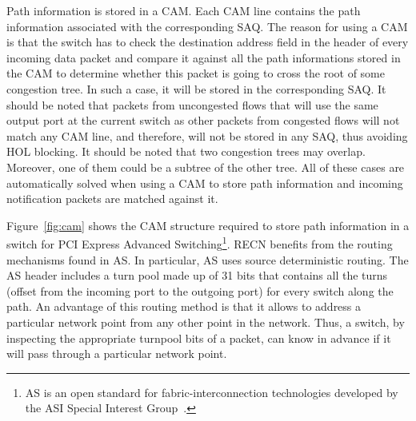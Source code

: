 \documentclass[12pt]{article}
\begin{document}
Path information is stored in a CAM. Each CAM line contains the path information associated with the corresponding SAQ. The reason for using a CAM is that the switch has to check the destination address field in the header of every incoming data packet and compare it against all the path informations stored in the CAM to determine whether this packet is going to cross the root of some congestion tree. In such a case, it will be stored in the corresponding SAQ. It should be noted that packets from uncongested flows that will use the same output port at the current switch as other packets from congested flows will not match any CAM line, and therefore, will not be stored in any SAQ, thus avoiding HOL blocking. It should be noted that two congestion trees may overlap. Moreover, one of them could be a subtree of the other tree. All of these cases are automatically solved when using a CAM to store path information and incoming notification packets are matched against it.

Figure~\ref{fig:cam} shows the CAM structure required to store path information in a switch for PCI Express Advanced Switching\footnote{AS is an open standard for fabric-interconnection technologies developed by the ASI Special Interest Group~\cite{AS}.}. RECN benefits from the routing mechanisms found in AS. In particular, AS uses source deterministic routing. The AS header includes a turn pool made up of 31 bits that contains all the turns (offset from the incoming port to the outgoing port) for every switch along the path. An advantage of this routing method is that it allows to address a particular network point from any other point in the network. Thus, a switch, by inspecting the appropriate turnpool bits of a packet, can know in advance if it will pass through a particular network point.
\end{document}
